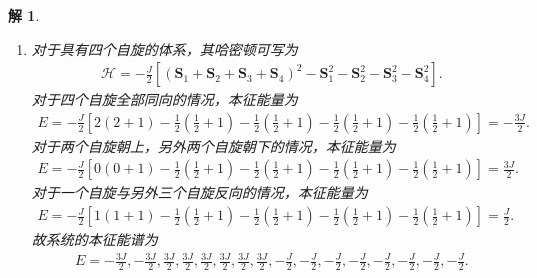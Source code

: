 \documentclass[UTF8,10pt,a4paper]{article}
\theoremstyle{Problem}
\theoremstyle{Solution}
\newtheorem*{sol}{解}
\begin{document}
\begin{sol}
\begin{enumerate}
\begin{align}
            \nonumber&\langle\text{两个自旋朝上，一个自旋朝下}\rvert\mathcal{H}\lvert\text{两个自旋朝上，一个自旋朝下}\rangle\\
            \nonumber=&\langle\text{两个自旋朝下，一个自旋朝上}\rvert\mathcal{H}\lvert\text{两个自旋朝下，一个自旋朝上}\rangle\\
            =&-\frac{J}{2}\left[\frac{1}{2}\left(\frac{1}{2}+1\right)-\frac{1}{2}\left(\frac{1}{2}+1\right)-\frac{1}{2}\left(\frac{1}{2}+1\right)-\frac{1}{2}\left(\frac{1}{2}+1\right)\right]=\frac{3}{4}J,\\
        \end{align}
        除此之外的非对角元均为$0$，故系统的本征能量为
        \begin{align}
            E=-\frac{3J}{4},-\frac{3J}{4},\frac{3J}{4},\frac{3J}{4},\frac{3J}{4},\frac{3J}{4},\frac{3J}{4},\frac{3J}{4}.
        \end{align}
        \item[(c)] 对于具有四个自旋的体系，其哈密顿可写为
        \begin{align}
            \mathcal{H}=-\frac{J}{2}[(\bm{S}_1+\bm{S}_2+\bm{S}_3+\bm{S}_4)^2-\bm{S}_1^2-\bm{S}_2^2-\bm{S}_3^2-\bm{S}_4^2].
        \end{align}
        对于四个自旋全部同向的情况，本征能量为
        \begin{align}
            E=-\frac{J}{2}\left[2(2+1)-\frac{1}{2}\left(\frac{1}{2}+1\right)-\frac{1}{2}\left(\frac{1}{2}+1\right)-\frac{1}{2}\left(\frac{1}{2}+1\right)-\frac{1}{2}\left(\frac{1}{2}+1\right)\right]=-\frac{3J}{2}.
        \end{align}
        对于两个自旋朝上，另外两个自旋朝下的情况，本征能量为
        \begin{align}
            E=-\frac{J}{2}\left[0(0+1)-\frac{1}{2}\left(\frac{1}{2}+1\right)-\frac{1}{2}\left(\frac{1}{2}+1\right)-\frac{1}{2}\left(\frac{1}{2}+1\right)-\frac{1}{2}\left(\frac{1}{2}+1\right)\right]=\frac{3J}{2}.
        \end{align}
        对于一个自旋与另外三个自旋反向的情况，本征能量为
        \begin{align}
            E=-\frac{J}{2}\left[1(1+1)-\frac{1}{2}\left(\frac{1}{2}+1\right)-\frac{1}{2}\left(\frac{1}{2}+1\right)-\frac{1}{2}\left(\frac{1}{2}+1\right)-\frac{1}{2}\left(\frac{1}{2}+1\right)\right]=\frac{J}{2}.
        \end{align}
        故系统的本征能谱为
        \begin{align}
            E=-\frac{3J}{2},-\frac{3J}{2},\frac{3J}{2},\frac{3J}{2},\frac{3J}{2},\frac{3J}{2},\frac{3J}{2},\frac{3J}{2},-\frac{J}{2},-\frac{J}{2},-\frac{J}{2},-\frac{J}{2},-\frac{J}{2},-\frac{J}{2},-\frac{J}{2},-\frac{J}{2}.
        \end{align}
    \end{enumerate}
\end{sol}
\end{document}
